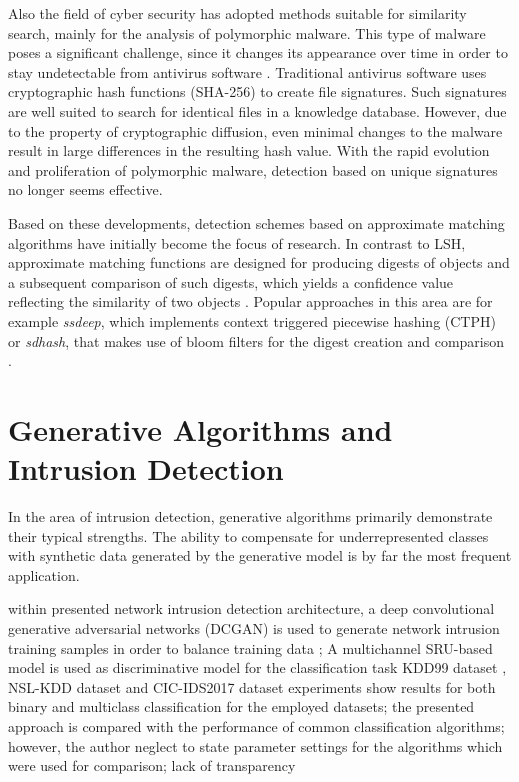 \documentclass[../../main.tex]{subfiles}
\begin{document}
Also the field of cyber security has adopted methods suitable for similarity search, mainly for the analysis of polymorphic malware. This type of malware poses a significant challenge, since it changes its appearance over time in order to stay undetectable from antivirus software \cite[p.91]{whitman_principles_2018}. 
Traditional antivirus software uses cryptographic hash functions (SHA-256) to create file signatures. Such signatures are well suited to search for identical files in a knowledge database. However, due to the property of cryptographic diffusion, even minimal changes to the malware result in large differences in the resulting hash value. With the rapid evolution and proliferation of polymorphic malware, detection based on unique signatures no longer seems effective. 

Based on these developments, detection schemes based on approximate matching algorithms have initially become the focus of research. In contrast to LSH, approximate matching functions are designed for producing digests of objects and a subsequent comparison of such digests, which yields a confidence value reflecting the similarity of two objects \cite{moia_similarity_2017}. Popular approaches in this area are for example \textit{ssdeep}, which implements context triggered piecewise hashing (CTPH) \cite{kornblum_identifying_2006} or \textit{sdhash}, that makes use of bloom filters for the digest creation and comparison \cite{chow_data_2010}.

\newpage
\section{Generative Algorithms and Intrusion Detection}
In the area of intrusion detection, generative algorithms primarily demonstrate their typical strengths. The ability to compensate for underrepresented classes with synthetic data generated by the generative model is by far the most frequent application.

within presented network intrusion detection architecture, a deep convolutional generative adversarial networks (DCGAN) is used to generate network intrusion training samples in order to balance training data \cite{8736331}; A multichannel SRU-based model is used as discriminative model for the classification task
KDD99 dataset \cite{kdd99}, NSL-KDD dataset \cite{nslkdd} and CIC-IDS2017 dataset \cite{sharafaldin_toward_2018}
experiments show results for both binary and multiclass classification for the employed datasets; the presented approach is compared with the performance of common classification algorithms; however, the author neglect to state parameter settings for the algorithms which were used for comparison; lack of transparency
\end{document}
